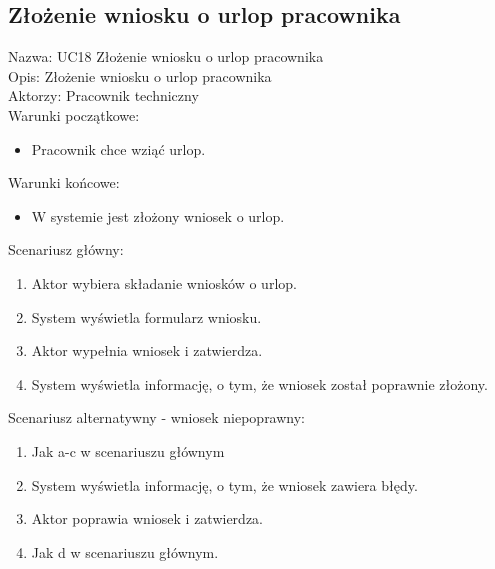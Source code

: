 \subsection{Złożenie wniosku o urlop pracownika}
\begin{adjustwidth}{5em}{0pt}
Nazwa: UC18 Złożenie wniosku o urlop pracownika \\
Opis: Złożenie wniosku o urlop pracownika \\
Aktorzy: Pracownik techniczny \\
Warunki początkowe:
\begin{itemize}
\item Pracownik chce wziąć urlop.
\end{itemize}
Warunki końcowe:
\begin{itemize}
\item W systemie jest złożony wniosek o urlop.
\end{itemize}
Scenariusz główny:
\begin{enumerate}
\item Aktor wybiera składanie wniosków o urlop.
\item System wyświetla formularz wniosku.
\item Aktor wypełnia wniosek i zatwierdza.
\item System wyświetla informację, o tym, że wniosek został poprawnie złożony.
\end{enumerate}
Scenariusz alternatywny - wniosek niepoprawny: 
\begin{enumerate}
\item Jak a-c w scenariuszu głównym
\item System wyświetla informację, o tym, że wniosek zawiera błędy.
\item Aktor poprawia wniosek i zatwierdza.
\item Jak d w scenariuszu głównym.
\end{enumerate}
\end{adjustwidth}


